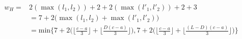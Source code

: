 \documentclass[11pt, oneside, dvipdfmx]{book}
\begin{document}
 \begin{equation}
 \begin{split}
 w_H =& 2 (\max(l_1,l_2))+2 + 2 (\max(l'_1,l'_2))+2 +3\\
 &=7+2 \Big(\max(l_1,l_2) + \max(l'_1,l'_2) \Big)\\
 &=\text{min}\Bigg\{  7+2 \Big( \Big\lfloor \frac{c - a}{3} \Big\rfloor + \Big\lfloor \frac{D(c - a)}{3} \Big\rfloor \Big), 7+2 \Big( \Big\lfloor \frac{c - a}{3} \Big\rfloor + \Big\lfloor \frac{(L-D)(c - a)}{3} \Big\rfloor \Big) \Bigg\}
 \end{split}
 \label{eq9}
 \end{equation}
 
\end{document}

